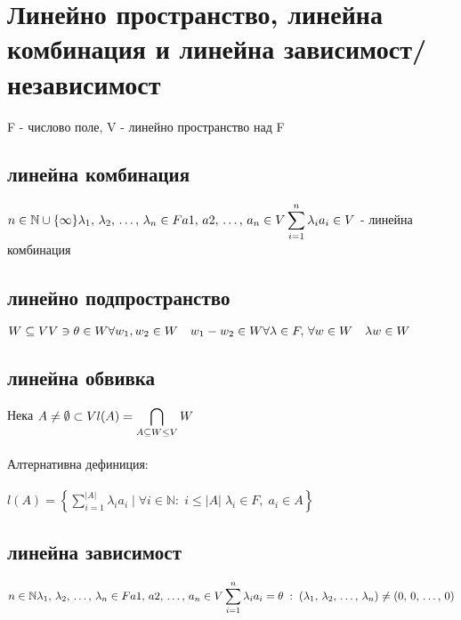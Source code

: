 \documentclass[12pt]{article}
\begin{document}
    \section{Линейно пространство, линейна комбинация и линейна зависимост/независимост}
    F - числово поле, V - линейно пространство над F
    \subsection{линейна комбинация}
    \(n \in \mathbb{N} \cup \{\infty\}\\\\
    \lambda_1, \, \lambda_2, \, \dots, \, \lambda_n \in F \\\\
    a1, \, a2, \, \dots, \, a_n \in V \\\\
    \displaystyle\sum_{i=1}^{n} \lambda_i a_i \in V\) - линейна комбинация
    \subsection{линейно подпространство}
    \(W \subseteq V\\\\
    V \ni \theta \in W \\\\ 
    \forall w_1, w_2 \in W \quad w_1 - w_2 \in W \\\\
    \forall \lambda \in F, \, \forall w \in W \quad \lambda w \in W\)
    \subsection{линейна обвивка}
    Нека \(A \neq \emptyset \subset V\\\\
    l(A) = \displaystyle\bigcap_{A \subseteq W \leq V} W\) \\\\
    Алтернативна дефиниция: \\\\
    \(l(A) = \left\{ \displaystyle\sum_{i = 1}^{|A|} \lambda_i a_i \; | \; \forall i \in \mathbb{N} : \; i \leq |A| \; \lambda_i \in F, \; a_i \in A \right \}\)
    \subsection{линейна зависимост}
    \(n \in \mathbb{N}\\\\
    \lambda_1, \, \lambda_2, \, \dots, \, \lambda_n \in F\\\\
    a1, \, a2, \, \dots, \, a_n \in V\\\\
    \displaystyle\sum_{i=1}^{n} \lambda_i a_i = \theta \; : \; (\lambda_1, \, \lambda_2, \, \dots, \, \lambda_n) \neq (0, \, 0, \, \dots, \, 0)\)
\end{document}
